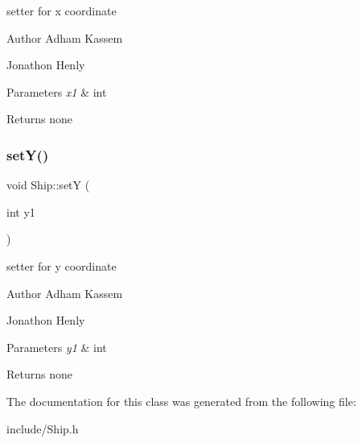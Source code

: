 setter for x coordinate \begin{DoxyAuthor}{Author}
Adham Kassem 

Jonathon Henly 
\end{DoxyAuthor}

\begin{DoxyParams}{Parameters}
{\em x1} & int \\
\hline
\end{DoxyParams}
\begin{DoxyReturn}{Returns}
none 
\end{DoxyReturn}
\mbox{\label{classShip_a6637c65a27a5d08b151e1763ec67c4e6}} 
\subsubsection{\texorpdfstring{set\+Y()}{setY()}}
{\footnotesize\ttfamily void Ship\+::setY (\begin{DoxyParamCaption}\item[{int}]{y1 }\end{DoxyParamCaption})\hspace{0.3cm}{\ttfamily [inline]}}

setter for y coordinate \begin{DoxyAuthor}{Author}
Adham Kassem 

Jonathon Henly 
\end{DoxyAuthor}

\begin{DoxyParams}{Parameters}
{\em y1} & int \\
\hline
\end{DoxyParams}
\begin{DoxyReturn}{Returns}
none 
\end{DoxyReturn}


The documentation for this class was generated from the following file\+:\begin{DoxyCompactItemize}
\item 
include/Ship.\+h\end{DoxyCompactItemize}
